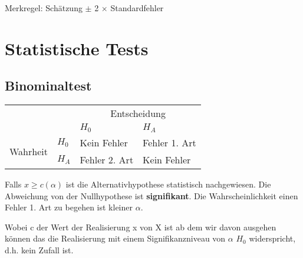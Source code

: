 \documentclass[8pt,a4paper]{scrartcl}
\begin{document}
\begin{multicols*}{3}
{Merkregel: \glqq Schätzung $\pm$ 2 $\times$ Standardfehler\grqq
}

\newpage

\section{Statistische Tests}

\subsection{Binominaltest}



\begin{center}
\begin{tabular}{|l|l|l|l|}
\cline{3-4}
\multicolumn{2}{c|}{}&\multicolumn{2}{c|}{Entscheidung}\\
\cline{3-4}
\multicolumn{2}{c|}{}&$H_0$&$H_A$\\
\hline
\multirow{2}{*}{Wahrheit}&$H_0$&Kein Fehler&Fehler 1. Art\\
\cline{2-4}
&$H_A$&Fehler 2. Art&Kein Fehler\\
\hline
\end{tabular}
\end{center}




Falls $x\geq c(\alpha)$ ist die Alternativhypothese statistisch nachgewiesen.
Die Abweichung von der Nullhypothese ist \textbf{signifikant}. \dahe Die Wahrscheinlichkeit einen Fehler 1. Art zu begehen ist kleiner $\alpha$.

Wobei c der Wert der Realisierung x von X ist ab dem wir davon ausgehen können das die Realisierung mit einem Signifikanzniveau von $\alpha$ $H_0$ widerspricht, d.h. kein Zufall ist.



\end{multicols*}
\end{document}

